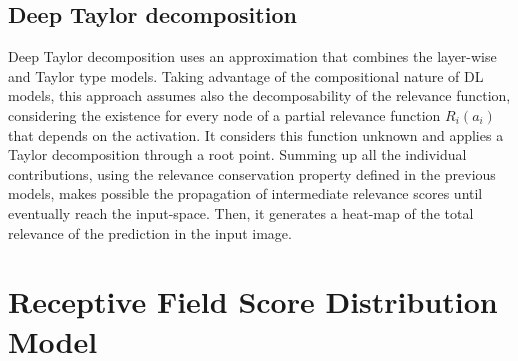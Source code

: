 \documentclass[review]{elsarticle}
\theoremstyle{definition} %
\theoremstyle{remark}
\begin{document}
\subsection{Deep Taylor decomposition}

Deep Taylor decomposition \cite{montavon2017explaining} uses an approximation that combines the layer-wise and Taylor type models. Taking advantage of the compositional nature of DL models, this approach assumes also the decomposability of the relevance function, considering the existence for every node of a partial relevance function $R_i(a_i)$ that depends on the activation. It considers this function unknown and applies a Taylor decomposition through a root point. Summing up all the individual contributions, using the relevance conservation property defined in the previous models, makes possible the propagation of intermediate relevance scores until eventually reach the input-space. Then, it generates a heat-map of the total relevance of the prediction in the input image. 

\section{Receptive Field Score Distribution Model}\label{sec:math}
\end{document}
